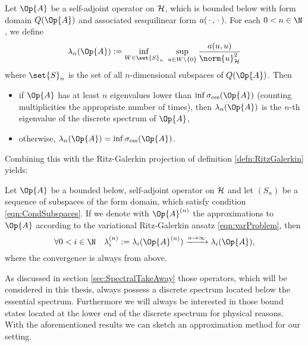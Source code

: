 \begin{thm}
	\label{thm:CourantFischer}
	Let $\Op{A}$ be a self-adjoint operator on $\mathcal{H}$,
	which is bounded below with form domain $Q(\Op{A})$
	and associated sesquilinear form $a(\,\cdot\,,\,\cdot\,)$.
	For each $0 < n \in \N$, we define
	\begin{equation}
		\lambda_n(\Op{A}) := \inf_{W \in \set{S}_n} \ \sup_{u \in W \backslash \{0\}}
		\frac{a(u,u)}{\norm{u}_\hilbert^2}
		\label{eqn:CourantFischer}
	\end{equation}
	where $\set{S}_n$ is the set of all $n$-dimensional subspaces of $Q(\Op{A})$.
	Then
	\begin{itemize}
		\item if $\Op{A}$ has at least $n$ eigenvalues lower
			than $\inf \sigma_\text{ess}(\Op{A})$ (counting multiplicities
			the appropriate number of times),
			then $\lambda_n(\Op{A})$ is the $n$-th eigenvalue of the discrete spectrum
			of $\Op{A}$,
		\item otherwise, $\lambda_n(\Op{A}) = \inf \sigma_\text{ess}(\Op{A})$.
	\end{itemize}
\end{thm}

\noindent
Combining this with the Ritz-Galerkin projection of definition \ref{defn:RitzGalerkin}
yields:

\begin{cor}
	\label{cor:Convergence}
	Let $\Op{A}$ be a bounded below, self-adjoint operator on $\mathcal{H}$
	and let $(S_n)$ be a sequence of subspaces of the form domain,
	which satisfy condition \eqref{eqn:CondSubspaces}.
	If we denote with $\Op{A}^{(n)}$
	the approximations to $\Op{A}$
	according to the variational Ritz-Galerkin ansatz
	\eqref{eqn:varProblem}, then
	\[ \forall 0 < i \in \N \quad \lambda^{(n)}_i := \lambda_i(\Op{A}^{(n)}) \xrightarrow{n\to\infty} \lambda_i(\Op{A}), \]
	where the convergence is always from above.
\end{cor}

As discussed in section \vref{sec:SpectralTakeAway}
those operators,
which will be considered in this thesis,
always possess a discrete spectrum located below the essential spectrum.
Furthermore we will always be interested
in those bound states located at the lower end of the discrete spectrum
for physical reasons.
With the aforementioned results we can
sketch an approximation method for our setting.

